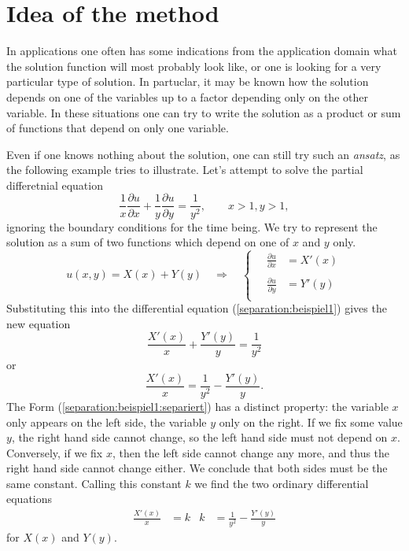 %
%
%

\section{Idea of the method}
In applications one often has some indications from the application
domain what the solution function will most probably look like, or one
is looking for a very particular type of solution.
In partuclar, it may be known how the solution depends on one of the
variables up to a factor depending only on the other variable.
In these situations one can try to write the solution as a product
or sum of functions that depend on only one variable.

Even if one knows nothing about the solution, one can still try such
an {\em ansatz}, as the following example tries to illustrate.
Let's attempt to solve the partial differetnial equation
\begin{equation}
\frac1x
\frac{\partial u}{\partial x}
+
\frac1y
\frac{\partial u}{\partial y}
=\frac1{y^2}
,
\qquad x>1, y>1,
\label{separation:beispiel1}
\end{equation}
ignoring the boundary conditions for the time being.
We try to represent the solution as a sum of two functions which depend
on one of $x$ and $y$ only.
\begin{equation}
u(x,y)=X(x)+Y(y)
\quad\Rightarrow\quad
\begin{cases}
\quad{\displaystyle \frac{\partial u}{\partial x}}&=X'(x)\\
\\
\quad{\displaystyle \frac{\partial u}{\partial y}}&=Y'(y)\\
\end{cases}
\label{separation:beispiel1:ansatz}
\end{equation}
Substituting this into the differential equation
(\ref{separation:beispiel1})
gives the new equation
\[
\frac{X'(x)}{x}+\frac{Y'(y)}{y}=\frac1{y^2}
\]
or
\begin{equation}
\frac{X'(x)}{x}
=\frac1{y^2}
-\frac{Y'(y)}{y}.
\label{separation:beispiel1:separiert}
\end{equation}
The Form (\ref{separation:beispiel1:separiert}) has a distinct property:
the variable $x$ only appears on the left side, the variable $y$ only on
the right.
If we fix some value $y$, the right hand side cannot change, so the left
hand side must not depend on $x$.
Conversely, if we fix $x$, then the left side cannot change any more,
and thus the right hand side cannot change either.
We conclude that both sides must be the same constant.
Calling this constant $k$ we find the two ordinary differential equations
\begin{align}
\frac{X'(x)}{x}&=k
&
k&=\frac1{y^2}-\frac{Y'(y)}{y}
\label{separation:beispiel1:separiertedgl}
\end{align}
for $X(x)$ and $Y(y)$.

